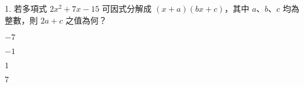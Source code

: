 \documentclass[12pt]{article}
\begin{document}
\begin{problem}
  \item[1.] 若多項式 $2x^2 + 7x - 15$ 可因式分解成 $(x + a)(bx + c)$，其中 $a$、$b$、$c$ 均為整數，則 $2a + c$ 之值為何？
  \begin{choices}
    \item $-7$
    \item $-1$
    \item $1$
    \item $7$
  \end{choices}
\end{problem}
\end{document}
